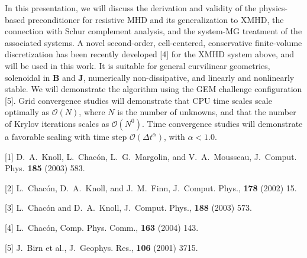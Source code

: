 \documentclass{report}
\begin{document}
In this presentation, we
will discuss the derivation and validity of the
physics-based preconditioner for resistive MHD and its
generalization to XMHD, the connection with Schur complement
analysis, and the system-MG treatment of the associated
systems. A novel second-order, cell-centered, conservative
finite-volume discretization has been recently developed [4]
for the XMHD system above, and will be used
in this work. It is suitable for general curvilinear
geometries, solenoidal in $\mathbf{B}$ and $\mathbf{J}$,
numerically non-dissipative, and linearly and nonlinearly
stable. We will demonstrate the algorithm using the GEM
challenge configuration [5].
Grid convergence
studies will demonstrate that CPU time scales scale
optimally as $\mathcal{O}(N)$, where $N$ is the number of
unknowns, and that the number of Krylov iterations scales as
$\mathcal{O}(N^{0})$. Time convergence studies will
demonstrate a favorable scaling with time step
$\mathcal{O}(\Delta t^{\alpha })$, with $\alpha <1.0$.

[1] D.~A.~Knoll, L.~Chac\'{o}n, L.~G.~Margolin, and V.~A.~Mousseau,
J.~Comput. Phys. \textbf{185} (2003) 583.

[2] L.~Chac\'{o}n, D.~A.~Knoll, and J.~M.~Finn,
J.~Comput. Phys., \textbf{178} (2002) 15.

[3] L.~Chac\'{o}n and D.~A.~Knoll, J.~Comput. Phys.,
\textbf{188} (2003) 573.

[4] L.~Chac\'{o}n, Comp. Phys. Comm., \textbf{163} (2004) 143.

[5] J.~Birn et al.,
J.~Geophys. Res., \textbf{106} (2001) 3715.


\end{document}
